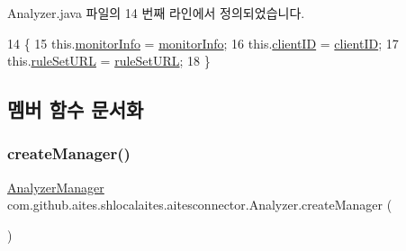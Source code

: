 Analyzer.\+java 파일의 14 번째 라인에서 정의되었습니다.


\begin{DoxyCode}
14                                                                                       \{
15         this.\mbox{\hyperlink{classcom_1_1github_1_1aites_1_1shlocalaites_1_1aitesconnector_1_1_analyzer_a33660c986fcdd452f0d02ddaf34649b5}{monitorInfo}} = \mbox{\hyperlink{classcom_1_1github_1_1aites_1_1shlocalaites_1_1aitesconnector_1_1_analyzer_a33660c986fcdd452f0d02ddaf34649b5}{monitorInfo}};
16         this.\mbox{\hyperlink{classcom_1_1github_1_1aites_1_1shlocalaites_1_1aitesconnector_1_1_analyzer_a22ef8f04e7f85cdb211af143b32d966a}{clientID}} = \mbox{\hyperlink{classcom_1_1github_1_1aites_1_1shlocalaites_1_1aitesconnector_1_1_analyzer_a22ef8f04e7f85cdb211af143b32d966a}{clientID}};
17         this.\mbox{\hyperlink{classcom_1_1github_1_1aites_1_1shlocalaites_1_1aitesconnector_1_1_analyzer_a4d70ca14c3921f457dbd46c8d1818f36}{ruleSetURL}} = \mbox{\hyperlink{classcom_1_1github_1_1aites_1_1shlocalaites_1_1aitesconnector_1_1_analyzer_a4d70ca14c3921f457dbd46c8d1818f36}{ruleSetURL}};
18     \}
\end{DoxyCode}


\subsection{멤버 함수 문서화}
\mbox{\label{classcom_1_1github_1_1aites_1_1shlocalaites_1_1aitesconnector_1_1_analyzer_ac4dda75b57fca5f9e506082de4a16ad8}} 
\subsubsection{\texorpdfstring{create\+Manager()}{createManager()}}
{\footnotesize\ttfamily \mbox{\hyperlink{classcom_1_1github_1_1aites_1_1shlocalaites_1_1aitesmanager_1_1_analyzer_manager}{Analyzer\+Manager}} com.\+github.\+aites.\+shlocalaites.\+aitesconnector.\+Analyzer.\+create\+Manager (\begin{DoxyParamCaption}{ }\end{DoxyParamCaption})}



